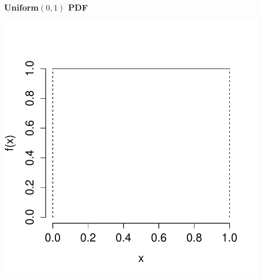 \documentclass[handout]{beamer}
\begin{document}
\begin{frame}
\frametitle{Uniform$(0,1)$ PDF}
\centering
	\includegraphics[scale = 0.6]{./images/uniform_density}

\end{frame}
\end{document}
